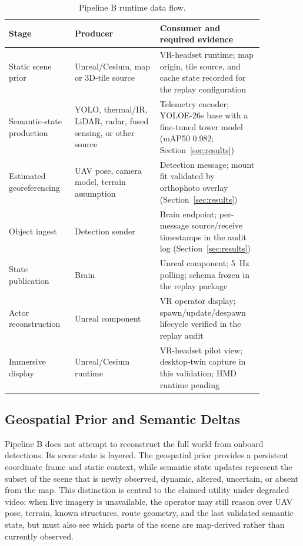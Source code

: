 \documentclass[fleqn]{VRIH2025}
\begin{document}
\begin{table}[H]
\centering
\small
\caption{Pipeline B runtime data flow.}
\label{tab:pipeline-b-runtime}
\begin{tabular}{@{}L{0.22\linewidth}L{0.30\linewidth}L{0.34\linewidth}@{}}
\toprule
Stage & Producer & Consumer and required evidence \\
\midrule
Static scene prior & Unreal/Cesium, map or 3D-tile source & VR-headset runtime; map origin, tile source, and cache state recorded for the replay configuration \\
Semantic-state production & YOLO, thermal/IR, LiDAR, radar, fused sensing, or other source & Telemetry encoder; YOLOE-26s base with a fine-tuned tower model (mAP50 0.982; Section~\ref{sec:results}) \\
Estimated georeferencing & UAV pose, camera model, terrain assumption & Detection message; mount fit validated by orthophoto overlay (Section~\ref{sec:results}) \\
Object ingest & Detection sender & Brain endpoint; per-message source/receive timestamps in the audit log (Section~\ref{sec:results}) \\
State publication & Brain & Unreal component; 5~Hz polling; schema frozen in the replay package \\
Actor reconstruction & Unreal component & VR operator display; spawn/update/despawn lifecycle verified in the replay audit \\
Immersive display & Unreal/Cesium runtime & VR-headset pilot view; desktop-twin capture in this validation; HMD runtime pending \\
\bottomrule
\end{tabular}
\normalsize
\end{table}

\subsection{Geospatial Prior and Semantic Deltas}

Pipeline B does not attempt to reconstruct the full world from onboard detections. Its scene state is layered. The geospatial prior provides a persistent coordinate frame and static context, while semantic state updates represent the subset of the scene that is newly observed, dynamic, altered, uncertain, or absent from the map. This distinction is central to the claimed utility under degraded video: when live imagery is unavailable, the operator may still reason over UAV pose, terrain, known structures, route geometry, and the last validated semantic state, but must also see which parts of the scene are map-derived rather than currently observed.
\end{document}
